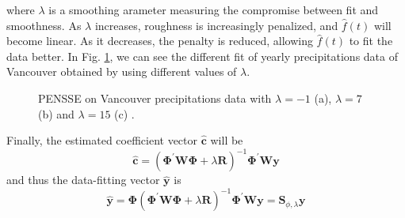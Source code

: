 where $\lambda$ is a smoothing arameter measuring the compromise between fit and smoothness. As $\lambda$ increases, roughness is increasingly penalized, and $\hat{f}(t)$ will become linear. As it decreases, the penalty is reduced, allowing $\hat{f}(t)$ to fit the data better. In Fig. \ref{fig:lambda}, we can see the different fit of yearly precipitations data of Vancouver obtained by using different values of $\lambda$.
\begin{figure}
    \centering
    \caption[PENSSE with different $\lambda$]{PENSSE on Vancouver precipitations data with $\lambda=-1$ (a), $\lambda=7$ (b) and $\lambda=15$ (c) \cite{ramsay_functional_2009}.}
    \label{fig:lambda}
\end{figure}
Finally, the estimated coefficient vector $\hat{\mathbf{c}}$ will be 
\begin{equation}
    \hat{\mathbf{c}}=\left(\boldsymbol{\Phi}^{\prime} \mathbf{W} \boldsymbol{\Phi}+\lambda \mathbf{R}\right)^{-1} \boldsymbol{\Phi}^{\prime} \mathbf{W} \mathbf{y}
\end{equation}
and thus the data-fitting vector $\mathbf{\hat{y}}$ is
\begin{equation}
    \label{eq:unbelcasino}
    \hat{\mathbf{y}}=\boldsymbol{\Phi}\left(\boldsymbol{\Phi}^{\prime} \mathbf{W} \boldsymbol{\Phi}+\lambda \mathbf{R}\right)^{-1} \boldsymbol{\Phi}^{\prime} \mathbf{W} \mathbf{y}=\mathbf{S}_{\phi, \lambda} \mathbf{y}
\end{equation}
